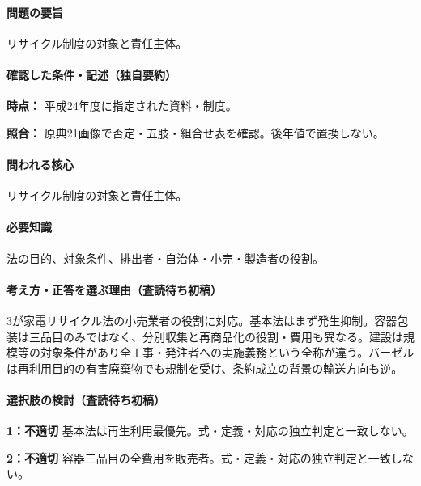 \paragraph{問題の要旨} リサイクル制度の対象と責任主体。

\paragraph{確認した条件・記述（独自要約）}\mbox{}\par

\noindent\textbf{時点：} 平成24年度に指定された資料・制度。\par

\noindent\textbf{照合：} 原典21画像で否定・五肢・組合せ表を確認。後年値で置換しない。\par

\paragraph{問われる核心} リサイクル制度の対象と責任主体。

\paragraph{必要知識} 法の目的、対象条件、排出者・自治体・小売・製造者の役割。

\paragraph{考え方・正答を選ぶ理由（査読待ち初稿）} 3が家電リサイクル法の小売業者の役割に対応。基本法はまず発生抑制。容器包装は三品目のみではなく、分別収集と再商品化の役割・費用も異なる。建設は規模等の対象条件があり全工事・発注者への実施義務という全称が違う。バーゼルは再利用目的の有害廃棄物でも規制を受け、条約成立の背景の輸送方向も逆。

\paragraph{選択肢の検討（査読待ち初稿）}\mbox{}\par

\noindent\textbf{1：不適切} 基本法は再生利用最優先。式・定義・対応の独立判定と一致しない。\par

\noindent\textbf{2：不適切} 容器三品目の全費用を販売者。式・定義・対応の独立判定と一致しない。\par

